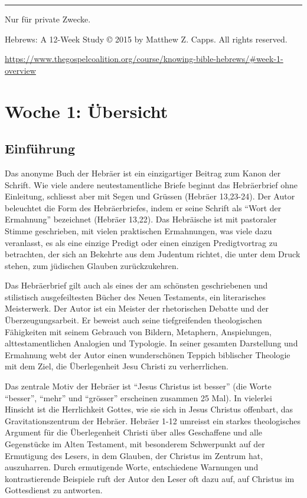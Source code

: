 \documentclass[]{krantz}
\begin{document}
\begin{center}\rule{0.5\linewidth}{0.5pt}\end{center}

Nur für private Zwecke.

Hebrews: A 12-Week Study © 2015 by Matthew Z. Capps. All rights
reserved.

\url{https://www.thegospelcoalition.org/course/knowing-bible-hebrews/\#week-1-overview}

\hypertarget{woche01}{\chapter{Woche 1: Übersicht}\label{woche01}}

\section{Einführung}\label{einfuxfchrung}

Das anonyme Buch der Hebräer ist ein einzigartiger Beitrag zum Kanon der
Schrift. Wie viele andere neutestamentliche Briefe beginnt das
Hebräerbrief ohne Einleitung, schliesst aber mit Segen und Grüssen
({Hebräer 13,23-24}). Der Autor beleuchtet die Form des Hebräerbriefes,
indem er seine Schrift als ``Wort der Ermahnung'' bezeichnet ({Hebräer
13,22}). Das Hebräische ist mit pastoraler Stimme geschrieben, mit
vielen praktischen Ermahnungen, was viele dazu veranlasst, es als eine
einzige Predigt oder einen einzigen Predigtvortrag zu betrachten, der
sich an Bekehrte aus dem Judentum richtet, die unter dem Druck stehen,
zum jüdischen Glauben zurückzukehren.

Das Hebräerbrief gilt auch als eines der am schönsten geschriebenen und
stilistisch ausgefeiltesten Bücher des Neuen Testaments, ein
literarisches Meisterwerk. Der Autor ist ein Meister der rhetorischen
Debatte und der Überzeugungsarbeit. Er beweist auch seine tiefgreifenden
theologischen Fähigkeiten mit seinem Gebrauch von Bildern, Metaphern,
Anspielungen, alttestamentlichen Analogien und Typologie. In seiner
gesamten Darstellung und Ermahnung webt der Autor einen wunderschönen
Teppich biblischer Theologie mit dem Ziel, die Überlegenheit Jesu
Christi zu verherrlichen.

Das zentrale Motiv der Hebräer ist ``Jesus Christus ist besser'' (die
Worte ``besser'', ``mehr'' und ``grösser'' erscheinen zusammen 25 Mal).
In vielerlei Hinsicht ist die Herrlichkeit Gottes, wie sie sich in Jesus
Christus offenbart, das Gravitationszentrum der Hebräer. Hebräer 1-12
umreisst ein starkes theologisches Argument für die Überlegenheit
Christi über alles Geschaffene und alle Gegenstücke im Alten Testament,
mit besonderem Schwerpunkt auf der Ermutigung des Lesers, in dem
Glauben, der Christus im Zentrum hat, auszuharren. Durch ermutigende
Worte, entschiedene Warnungen und kontrastierende Beispiele ruft der
Autor den Leser oft dazu auf, auf Christus im Gottesdienst zu antworten.
\end{document}
